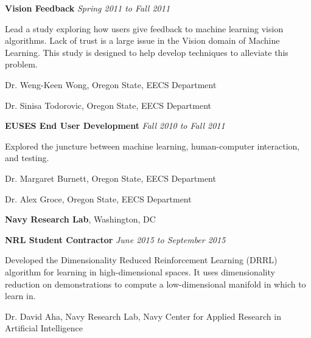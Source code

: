 \documentclass[10pt]{article}
\begin{document}
\begin{outerlist}
\item[] \textbf{Vision Feedback }%
        \hfill \textit{Spring 2011 to Fall 2011}
        \begin{innerlist}
        	\item Lead a study exploring how users give feedback to machine learning vision algorithms. Lack of trust is a large issue in the Vision domain of Machine Learning. This study is designed to help develop techniques to alleviate this problem.
        	\begin{innerlist}
        		\item Dr. Weng-Keen Wong, Oregon State, EECS Department
        		\item Dr. Sinisa Todorovic, Oregon State, EECS Department
        	\end{innerlist}
        \end{innerlist}


\item[] \textbf{EUSES End User Development}
        \hfill \textit{Fall 2010 to Fall 2011}
\begin{innerlist}
    \item Explored the juncture between machine learning, human-computer interaction, and testing.
    \begin{innerlist}
    \item Dr. Margaret Burnett, Oregon State, EECS Department
    \item Dr. Alex Groce, Oregon State, EECS Department
    \end{innerlist}
\end{innerlist}
\end{outerlist}


\textbf{Navy Research Lab},
Washington, DC
\begin{outerlist}

\item[] \textbf{NRL Student Contractor}%
        \hfill \textit{June 2015 to September 2015}
	\begin{innerlist}
		\item Developed the Dimensionality Reduced Reinforcement Learning (DRRL) algorithm for learning in high-dimensional spaces. It uses dimensionality reduction on demonstrations to compute a low-dimensional manifold in which to learn in.
		\begin{innerlist}
			\item Dr. David Aha, Navy Research Lab, Navy Center for Applied Research in Artificial Intelligence
		\end{innerlist}
	\end{innerlist}
\end{outerlist}
\end{document}
